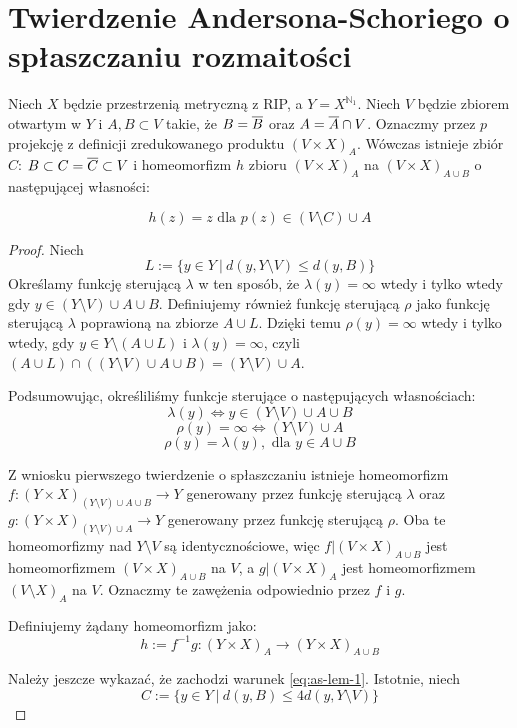 \section{Twierdzenie Andersona-Schoriego o spłaszczaniu rozmaitości}

\begin{lem}
  Niech $X$ będzie przestrzenią metryczną z RIP, a $Y = X^{\mathbb{N}_1}$. Niech $V$ będzie zbiorem otwartym w $Y$ i $A, B \subset V$ takie, że $B = \overline{B}$ oraz $A = \overline{A} \cap V$. Oznaczmy przez $p$ projekcję z definicji zredukowanego produktu $(V \times X)_A$. Wówczas istnieje zbiór $C$: $B \subset C = \overline{C} \subset V$ i homeomorfizm $h$ zbioru $(V \times X)_A$ na $(V \times X)_{A \cup B}$ o następującej własności:
  
  \begin{equation} \label{eq:as-lem-1}
  h(z) = z \mbox{ dla } p(z) \in (V \setminus C) \cup A
  \end{equation}
  
  \begin{proof}
    Niech
    $$L := \{y \in Y\ |\ d(y, Y \setminus V) \leq d(y, B)\}$$
    Określamy funkcję sterującą $\lambda$ w ten sposób, że $\lambda(y) = \infty$ wtedy i tylko wtedy gdy $y \in (Y \setminus V) \cup A \cup B$.
    Definiujemy również funkcję sterującą $\rho$ jako funkcję sterującą $\lambda$ poprawioną na zbiorze $A \cup L$. Dzięki temu $\rho(y) = \infty$ wtedy i tylko wtedy, gdy $y \in Y \setminus (A \cup L)$ i $\lambda(y) = \infty$, czyli $(A \cup L) \cap ((Y \setminus V) \cup A \cup B) = (Y \setminus V) \cup A$.
    
    Podsumowując, określiliśmy funkcje sterujące o następujących własnościach:
    $$\lambda(y) \Leftrightarrow y \in (Y \setminus V) \cup A \cup B$$
    $$\rho(y) = \infty \Leftrightarrow (Y \setminus V) \cup A$$
    $$\rho(y) = \lambda(y), \mbox{ dla } y \in A \cup B$$
    
    Z wniosku pierwszego twierdzenie o spłaszczaniu istnieje homeomorfizm $f: (Y \times X)_{(Y \setminus V) \cup A \cup B} \rightarrow Y$ generowany przez funkcję sterującą $\lambda$ oraz $g: (Y \times X)_{(Y \setminus V) \cup A} \rightarrow Y$ generowany przez funkcję sterującą $\rho$. Oba te homeomorfizmy nad $Y \setminus V$ są identycznościowe, więc $f|(V \times X)_{A \cup B}$ jest homeomorfizmem $(V \times X)_{A \cup B}$ na $V$, a $g|(V \times X)_{A}$ jest homeomorfizmem $(V \setminus X)_{A}$ na $V$. Oznaczmy te zawężenia odpowiednio przez $f$ i $g$.
    
    Definiujemy żądany homeomorfizm jako:
    $$h := f^{-1} g: (Y \times X)_{A} \rightarrow (Y \times X)_{A \cup B}$$
    
    Należy jeszcze wykazać, że zachodzi warunek \eqref{eq:as-lem-1}. Istotnie, niech
    $$C := \{y \in Y\ |\ d(y,B) \leq 4 d(y, Y \setminus V)\}$$
  \end{proof}

\end{lem}
